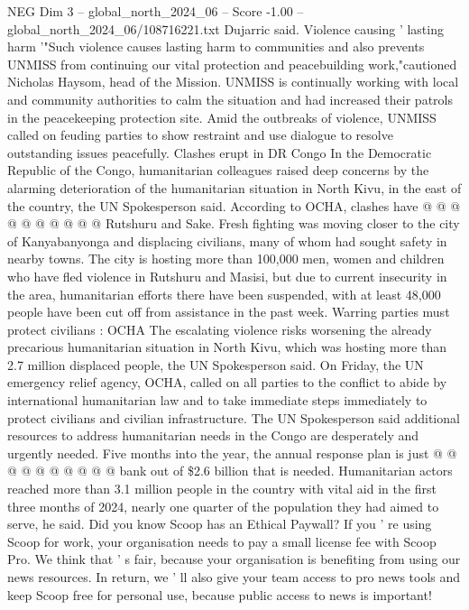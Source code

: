 \begin{textsample}{NEG Dim 3 – global\_north\_2024\_06 – Score -1.00 – global\_north\_2024\_06/108716221.txt}
Dujarric said.
Violence causing ' lasting harm '"Such violence causes lasting harm to communities and also prevents UNMISS from continuing our vital protection and peacebuilding work,"cautioned Nicholas Haysom, head of the Mission.
UNMISS is continually working with local and community authorities to calm the situation and had increased their patrols in the peacekeeping protection site.
Amid the outbreaks of violence, UNMISS called on feuding parties to show restraint and use dialogue to resolve outstanding issues peacefully.
Clashes erupt in DR Congo In the Democratic Republic of the Congo, humanitarian colleagues raised deep concerns by the alarming deterioration of the humanitarian situation in North Kivu, in the east of the country, the UN Spokesperson said.
According to OCHA, clashes have @ @ @ @ @ @ @ @ @ @ Rutshuru and Sake.
Fresh fighting was moving closer to the city of Kanyabanyonga and displacing civilians, many of whom had sought safety in nearby towns.
The city is hosting more than 100,000 men, women and children who have fled violence in Rutshuru and Masisi, but due to current insecurity in the area, humanitarian efforts there have been suspended, with at least 48,000 people have been cut off from assistance in the past week.
Warring parties must protect civilians : OCHA The escalating violence risks worsening the already precarious humanitarian situation in North Kivu, which was hosting more than 2.7 million displaced people, the UN Spokesperson said.
On Friday, the UN emergency relief agency, OCHA, called on all parties to the conflict to abide by international humanitarian law and to take immediate steps immediately to protect civilians and civilian infrastructure.
The UN Spokesperson said additional resources to address humanitarian needs in the Congo are desperately and urgently needed.
Five months into the year, the annual response plan is just @ @ @ @ @ @ @ @ @ @ bank out of \$2.6 billion that is needed.
Humanitarian actors reached more than 3.1 million people in the country with vital aid in the first three months of 2024, nearly one quarter of the population they had aimed to serve, he said.
Did you know Scoop has an Ethical Paywall?
If you ' re using Scoop for work, your organisation needs to pay a small license fee with Scoop Pro.
We think that ' s fair, because your organisation is benefiting from using our news resources.
In return, we ' ll also give your team access to pro news tools and keep Scoop free for personal use, because public access to news is important!

\end{textsample}
